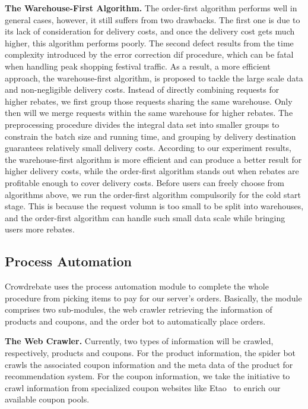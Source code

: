 \textbf{The Warehouse-First Algorithm.} The order-first algorithm performs well in general cases,  however, it still suffers from two drawbacks. The first one is due to its lack of consideration for delivery costs, and once the delivery cost gets much higher, this algorithm performs poorly. The second defect results from the time complexity introduced by the error correction dif procedure, which can be fatal when handling peak shopping festival traffic. As a result, a more efficient approach, the warehouse-first algorithm, is proposed to tackle the large scale data and non-negligible delivery costs. Instead of directly combining requests for higher rebates, we first group those requests sharing the same warehouse. Only then will we merge requests within the same warehouse for higher rebates. The preprocessing procedure divides the integral data set into smaller groups to constrain the batch size and running time, and grouping by delivery destination guarantees relatively small delivery costs. According to our experiment results, the warehouse-first algorithm is more efficient and can produce a better result for higher delivery costs, while the order-first algorithm stands out when rebates are profitable enough to cover delivery costs. Before users can freely choose from algorithms above, we run the order-first algorithm compulsorily for the cold start stage. This is because the request volumn is too small to be split into warehouses, and the order-first algorithm can handle such small data scale while bringing users more rebates.

\subsection{Process Automation}

Crowdrebate uses the process automation module to complete the whole procedure from picking items to pay for our server's orders. Basically, the module comprises two sub-modules, the web crawler retrieving the information of products and coupons, and the order bot to automatically place orders. 

\textbf{The Web Crawler.} Currently, two types of information will be crawled, respectively, products and coupons. For the product information, the spider bot crawls the associated coupon information and the meta data of the product for recommendation system. For the coupon information, we take the initiative to crawl information from specialized coupon websites like Etao~\cite{etao} to enrich our available coupon pools. 


